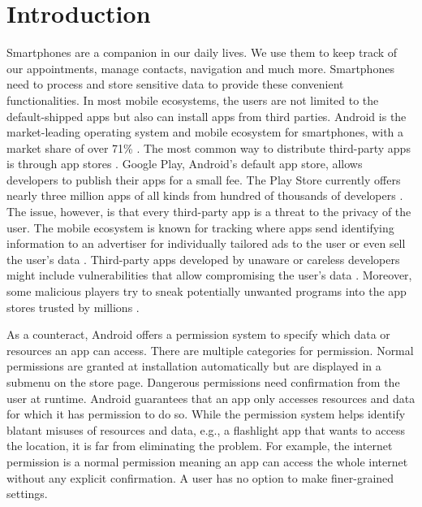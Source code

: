 \documentclass[../draft.tex]{subfiles}
\begin{document}
    \chapter{Introduction}
    Smartphones are a companion in our daily lives.
    We use them to keep track of our appointments, manage contacts, navigation and much more.
    Smartphones need to process and store sensitive data to provide these convenient functionalities.
    In most mobile ecosystems, the users are not limited to the default-shipped apps but also can install apps from third parties.
    Android is the market-leading operating system and mobile ecosystem for smartphones, with a market share of over 71\% \cite{Statista2021}.
    The most common way to distribute third-party apps is through app stores \cite{Kotzias2021}.
    Google Play, Android's default app store, allows developers to publish their apps for a small fee.
    The Play Store currently offers nearly three million apps of all kinds from hundred of thousands of developers \cite{Statista2020}.
    The issue, however, is that every third-party app is a threat to the privacy of the user.
    The mobile ecosystem is known for tracking where apps send identifying information to an advertiser for individually tailored ads to the user or even sell the user's data \cite{Binns2018, Enck2011}.
    Third-party apps developed by unaware or careless developers might include vulnerabilities that allow compromising the user's data \cite{Backes2016}.
    Moreover, some malicious players try to sneak potentially unwanted programs into the app stores trusted by millions \cite{Rahman2016}.
    
    As a counteract, Android offers a permission system to specify which data or resources an app can access. 
    There are multiple categories for permission.
    Normal permissions are granted at installation automatically but are displayed in a submenu on the store page. 
    Dangerous permissions need confirmation from the user at runtime.
    Android guarantees that an app only accesses resources and data for which it has permission to do so.\footnotemark{}
    While the permission system helps identify blatant misuses of resources and data, e.g., a flashlight app that wants to access the location, it is far from eliminating the problem.
    For example, the internet permission is a normal permission meaning an app can access the whole internet without any explicit confirmation.
    A user has no option to make finer-grained settings.
\end{document}
